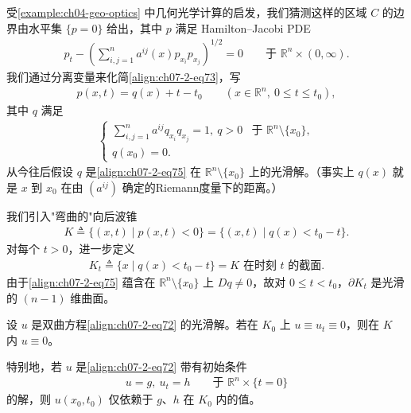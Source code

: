 \documentclass[../../main.tex]{subfiles}
\begin{document}
受\cref{example:ch04-geo-optics} 中几何光学计算的启发，我们猜测这样的区域 $C$ 的边界由水平集 $\{p=0\}$ 给出，其中 $p$ 满足 Hamilton--Jacobi PDE
\begin{align}
p_t - \left(\sum_{i,j=1}^n a^{ij}(x)p_{x_i}p_{x_j}\right)^{1/2} = 0\qquad \text{于 } \mathbb{R}^n\times(0,\infty).\label{align:ch07-2-eq73}
\end{align}
我们通过分离变量来化简\eqref{align:ch07-2-eq73}，写
\begin{align}
p(x,t)=q(x)+t-t_0\qquad (x\in\mathbb{R}^n,\ 0\leqslant t\leqslant t_0),\label{align:ch07-2-eq74}
\end{align}
其中 $q$ 满足
\begin{align}
\begin{cases}
\displaystyle\sum_{i,j=1}^n a^{ij}q_{x_i}q_{x_j}=1,\ q>0 & \text{于 } \mathbb{R}^n\setminus\{x_0\},\\
q(x_0)=0.
\end{cases}\label{align:ch07-2-eq75}
\end{align}
从今往后假设 $q$ 是\eqref{align:ch07-2-eq75} 在 $\mathbb{R}^n\setminus\{x_0\}$ 上的光滑解。（事实上 $q(x)$ 就是 $x$ 到 $x_0$ 在由 $(a^{ij})$ 确定的Riemann度量下的距离。）

我们引入"弯曲的"向后波锥
\begin{align*}
K\triangleq \{(x,t)\mid p(x,t)<0\}=\{(x,t)\mid q(x)<t_0-t\}.
\end{align*}
对每个 $t>0$，进一步定义
\begin{align}
K_t\triangleq \{x\mid q(x)<t_0-t\}=K \text{ 在时刻 } t \text{ 的截面}.\label{align:ch07-2-eq76}
\end{align}
由于\eqref{align:ch07-2-eq75} 蕴含在 $\mathbb{R}^n\setminus\{x_0\}$ 上 $Dq\neq 0$，故对 $0\leqslant t<t_0$，$\partial K_t$ 是光滑的 $(n-1)$ 维曲面。

\begin{theorem}[有限传播速度。]\label{theorem:ch07-2-有限传播速度}设 $u$ 是双曲方程\eqref{align:ch07-2-eq72} 的光滑解。若在 $K_0$ 上 $u\equiv u_t\equiv 0$，则在 $K$ 内 $u\equiv 0$。
\end{theorem}

特别地，若 $u$ 是\eqref{align:ch07-2-eq72} 带有初始条件
\begin{align}
u=g,\ u_t=h\qquad \text{于 } \mathbb{R}^n\times\{t=0\}\label{align:ch07-2-eq77}
\end{align}
的解，则 $u(x_0,t_0)$ 仅依赖于 $g$、$h$ 在 $K_0$ 内的值。
\end{document}
